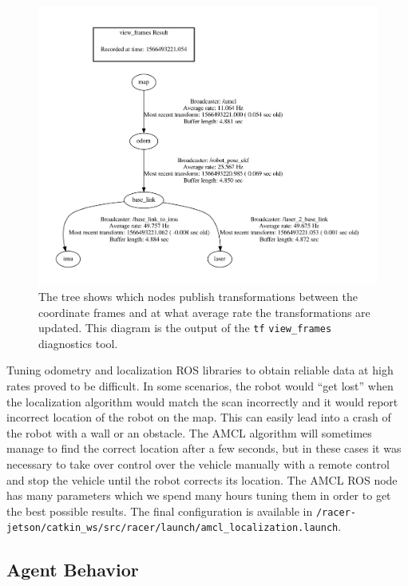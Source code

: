 \begin{figure}
	\centering
	\includegraphics[width=125mm]{../img/racing_tf_tree.pdf}
	\cprotect\caption{The tree shows which nodes publish transformations between the coordinate frames and at what average rate the transformations are updated. This diagram is the output of the \verb|tf| \verb|view_frames| diagnostics tool.}
	\label{fig:tf_tree_racing}
\end{figure}

Tuning odometry and localization ROS libraries to obtain reliable data at high rates proved to be difficult. In some scenarios, the robot would ``get lost'' when the localization algorithm would match the scan incorrectly and it would report incorrect location of the robot on the map. This can easily lead into a crash of the robot with a wall or an obstacle. The \gls*{AMCL} algorithm will sometimes manage to find the correct location after a few seconds, but in these cases it was necessary to take over control over the vehicle manually with a remote control and stop the vehicle until the robot corrects its location. The \gls*{AMCL} \gls*{ROS} node has many parameters which we spend many hours tuning them in order to get the best possible results. The final configuration is available in \newline\verb|/racer-jetson/catkin_ws/src/racer/launch/amcl_localization.launch|.

\subsection{Agent Behavior}
\label{sec:agent_impl}


